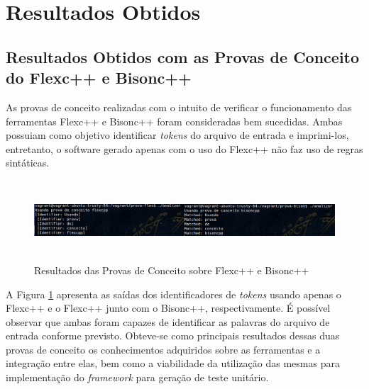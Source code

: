 \section{Resultados Obtidos}
\subsection{Resultados Obtidos com as Provas de Conceito do Flexc++ e Bisonc++}
As provas de conceito realizadas com o intuito de verificar o funcionamento das
ferramentas Flexc++ e Bisonc++ foram consideradas bem sucedidas. Ambas possuiam
como objetivo identificar \textit{tokens} do arquivo de entrada e imprimi-los,
entretanto, o software gerado apenas com o uso do Flexc++ não faz uso de regras
sintáticas.

 \begin{figure}[h]
    \centering
    \includegraphics[width=\textwidth,height=3cm]{figuras/resultadosPCBF.png}
    \caption{Resultados das Provas de Conceito sobre Flexc++ e Bisonc++}
    \label{fig:resultadosPCBF}
 \end{figure}

\par
\indent A Figura \ref{fig:resultadosPCBF} apresenta as saídas dos identificadores de
\textit{tokens} usando apenas o Flexc++ e o Flexc++ junto com o Bisonc++, respectivamente.
É possível observar que ambas foram capazes de identificar as palavras do arquivo
de entrada conforme previsto. Obteve-se como principais resultados dessas duas
provas de conceito os conhecimentos adquiridos sobre as ferramentas e a integração
entre elas, bem como a viabilidade da utilização das mesmas para implementação
do \textit{framework} para geração de teste unitário.

